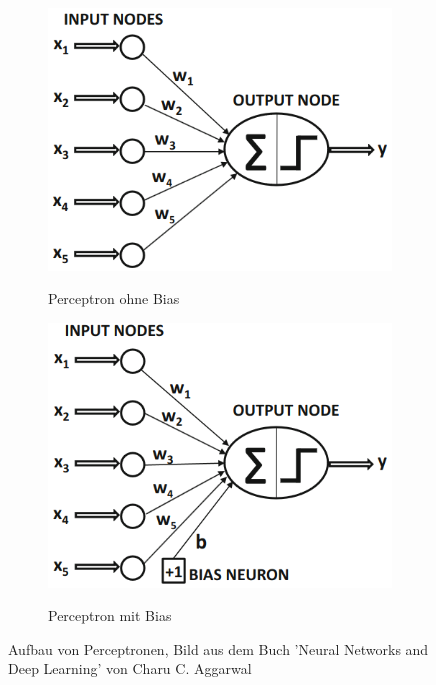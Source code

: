 \begin{figure}[H]
    \begin{subfigure}{0.5\textwidth}
        \includegraphics[width=\textwidth]{Sources/02-01_perceptron.png}
        \label{Synapse}
        \caption{{Perceptron ohne Bias}}
    \end{subfigure}
    \begin{subfigure}{0.5\textwidth}
        \includegraphics[width=\textwidth]{Sources/02-02_perceptronMitBias.png}
        \label{Neuron}
        \caption{Perceptron mit Bias}
    \end{subfigure}
    \caption{Aufbau von Perceptronen, Bild aus dem Buch 'Neural Networks and Deep Learning' von Charu C. Aggarwal
    }
    \end{figure}

